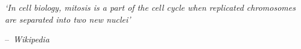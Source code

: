 \makeatletter
\newenvironment{chapquote}[2][2em]
  {\setlength{\@tempdima}{#1}%
   \def\chapquote@author{#2}%
   \parshape 1 \@tempdima \dimexpr\textwidth-2\@tempdima\relax%
   \itshape}
  {\par\normalfont\hfill--\ \chapquote@author\hspace*{\@tempdima}\par\bigskip}
\makeatother


\pagebreak
\hspace{0pt}
\vfill

\begin{chapquote}{\textit{Wikipedia}}
`In cell biology, mitosis  is a part of the cell cycle when replicated chromosomes are separated into two new nuclei'
\end{chapquote}

\vfill
\hspace{0pt}
\pagebreak